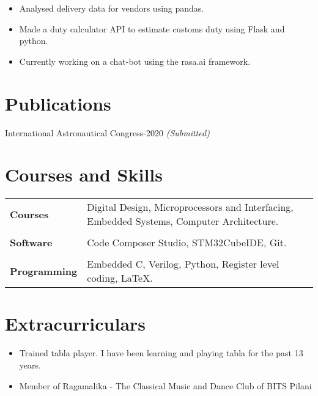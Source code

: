 \documentclass{resume}
\begin{document}
\begin{itemize}\setlength{\itemsep}{0pt}\setlength{\parskip}{0pt}\vspace{-0.5em}
    \item Analysed delivery data for vendors using pandas.
    \item Made a duty calculator API to estimate customs duty using Flask and python.
    \item Currently working on a chat-bot using the rasa.ai framework.
\end{itemize}

\vspace{-0.5cm}
\section{Publications}
 { International Astronautical Congress-2020}{\emph{ (Submitted)}}
\section{Courses and Skills}
\vspace{-0.5cm}
\begin{table}[!htb]
    \begin{tabular}{l|l}
    \textbf{Courses}        &   Digital Design, Microprocessors and Interfacing, Embedded Systems, Computer Architecture. \\
                            &   \\
    \textbf{Software}       &   Code Composer Studio, STM32CubeIDE, Git.\\
                            &   \\
    \textbf{Programming}    &   Embedded C, Verilog, Python, Register level coding, \LaTeX.\\
    \end{tabular}
\end{table}
\vspace{-0.5cm}
\section{Extracurriculars}
\begin{itemize}\setlength{\itemsep}{0pt}\setlength{\parskip}{0pt}\vspace{-0.5em}
    \item Trained tabla player. I have been learning and playing tabla for the past 13 years.
    \item Member of Ragamalika - The Classical Music and Dance Club of BITS Pilani 
\end{itemize}
\end{document}
